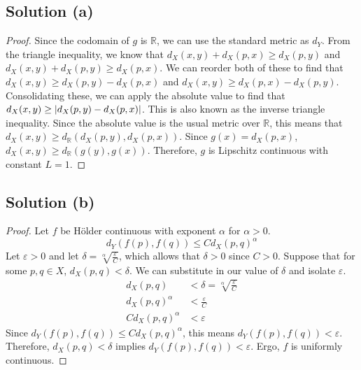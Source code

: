 \documentclass[11pt]{article}
\begin{document}
    \subsection{Solution (a)}
        \begin{proof}
            Since the codomain of $g$ is $\mathbb{R}$, we can use the standard metric as $d_Y$.
            From the triangle inequality, we know that $d_X(x,y) + d_X(p,x) \geq d_X(p,y)$ and $d_X(x,y) + d_X(p,y) \geq d_X(p,x)$.
            We can reorder both of these to find that $d_X(x,y) \geq d_X(p,y) - d_X(p,x)$ and $d_X(x,y) \geq d_X(p,x) - d_X(p,y)$.
            Consolidating these, we can apply the absolute value to find that $d_X(x,y) \geq \left| d_X(p,y) - d_X(p,x) \right|$.
            This is also known as the inverse triangle inequality.
            Since the absolute value is the usual metric over $\mathbb{R}$, this means that $d_X(x,y) \geq d_{\mathbb{R}}(d_X(p,y), d_X(p,x))$.
            Since $g(x) = d_X(p,x)$, $d_X(x,y) \geq d_{\mathbb{R}}(g(y), g(x))$.
            Therefore, $g$ is Lipschitz continuous with constant $L = 1$.
        \end{proof}

    \subsection{Solution (b)}
        \begin{proof}
            Let $f$ be H\"older continuous with exponent $\alpha$ for $\alpha > 0$.
            \begin{equation}
                d_Y(f(p),f(q)) \leq C d_X(p,q)^\alpha
            \end{equation}
            Let $\varepsilon > 0$ and let $\delta = \sqrt[\alpha]{\frac{\varepsilon}{C}}$, which allows that $\delta > 0$ since $C > 0$.
            Suppose that for some $p,q \in X$, $d_X(p,q) < \delta$.
            We can substitute in our value of $\delta$ and isolate $\varepsilon$.
            \begin{align}
                d_X(p,q)    &<  \delta 
                    =   \sqrt[\alpha]{\frac{\varepsilon}{C}}\\
                d_X(p,q)^{\alpha}   &<  \frac{\varepsilon}{C}\\
                C d_X(p,q)^{\alpha} &<  \varepsilon
            \end{align}
            Since $d_Y(f(p),f(q)) \leq C d_X(p,q)^\alpha$, this means $d_Y(f(p),f(q)) < \varepsilon$.
            Therefore, $d_X(p,q) < \delta$ implies $d_Y(f(p),f(q)) < \varepsilon$.
            Ergo, $f$ is uniformly continuous.
        \end{proof}
\end{document}
